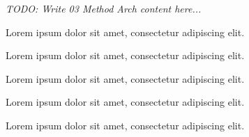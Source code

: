 \textit{TODO: Write 03 Method Arch content here...}
\par Lorem ipsum dolor sit amet, consectetur adipiscing elit. \par Lorem ipsum dolor sit amet, consectetur adipiscing elit. \par Lorem ipsum dolor sit amet, consectetur adipiscing elit. \par Lorem ipsum dolor sit amet, consectetur adipiscing elit. \par Lorem ipsum dolor sit amet, consectetur adipiscing elit. 
